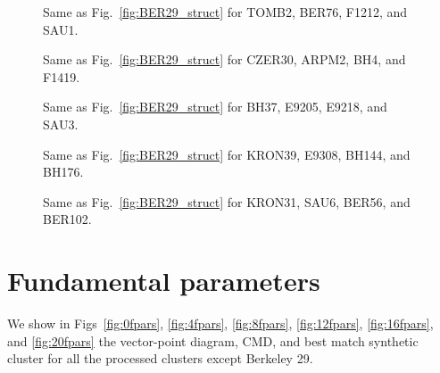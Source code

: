 \documentclass[draft]{aa}
\begin{document}
\begin{appendix}
 \begin{figure}
  \caption{Same as Fig.~\ref{fig:BER29_struct} for TOMB2, BER76, F1212, and SAU1.}
  \label{fig:4struct}
 \end{figure}

 \begin{figure}
  \caption{Same as Fig.~\ref{fig:BER29_struct} for CZER30, ARPM2, BH4, and F1419.}
  \label{fig:8struct}
 \end{figure}

 \begin{figure}
  \caption{Same as Fig.~\ref{fig:BER29_struct} for BH37, E9205, E9218, and SAU3.}
  \label{fig:12struct}
 \end{figure}

 \begin{figure}
  \caption{Same as Fig.~\ref{fig:BER29_struct} for KRON39, E9308, BH144, and BH176.}
  \label{fig:16struct}
 \end{figure}

 \begin{figure}
  \caption{Same as Fig.~\ref{fig:BER29_struct} for KRON31, SAU6, BER56, and BER102.}
  \label{fig:20struct}
 \end{figure}


\FloatBarrier
\section{Fundamental parameters}
 \label{app:fundam_params}

 We show in Figs~\ref{fig:0fpars}, \ref{fig:4fpars}, \ref{fig:8fpars},
 \ref{fig:12fpars}, \ref{fig:16fpars}, and \ref{fig:20fpars} the vector-point
 diagram, CMD, and best match synthetic cluster for all the processed clusters
 except Berkeley 29.


\end{appendix}
\end{document}
